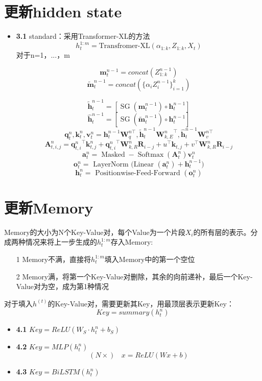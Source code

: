 \documentclass{article}
\begin{document}
\section{更新hidden state}
	\begin{itemize}
		\item \textbf{3.1} standard：采用Transformer-XL的方法
			$$h_t^{1:m} = \text{Transfromer-XL}(\alpha_{1:k}, Z_{1:k}, X_t)$$ 
			对于n=1，...，m
			
	$$\textbf{m}_t^{n-1} = concat(Z_{1:k}^{n-1})$$
	$$\tilde{\textbf{m}}_t^{n-1} = concat(\{\alpha_iZ_i^{n-1}\}_{i=1}^k) $$
			
$$\tilde{\mathbf{h}}_{t}^{n-1}=\left[\operatorname{SG}\left(\mathbf{m}_{t}^{n-1}\right) \circ \mathbf{h}_{t}^{n-1}\right]$$
$$\hat{\mathbf{h}}_{t}^{n-1}=\left[\operatorname{SG}\left(\tilde{\mathbf{m}}_{t}^{n-1}\right) \circ \mathbf{h}_{t}^{n-1}\right]$$
$$\mathbf{q}_{t}^{n}, \mathbf{k}_{t}^{n}, \mathbf{v}_{t}^{n}=\mathbf{h}_{t}^{n-1} \mathbf{W}_{q}^{n \top}, \tilde{\mathbf{h}}_{t}^{n-1} {\mathbf{W}_{k, E}^{n}}^{\top}, \hat{\mathbf{h}}_{t}^{n-1} \mathbf{W}_{v}^{n \top}$$
$$\mathbf{A}_{t, i, j}^{n}={\mathbf{q}_{t, i}^{n}}^{\top} \mathbf{k}_{t, j}^{n}+{\mathbf{q}_{t, i}^{n}}^{\top} \mathbf{W}_{k, R}^{n} \mathbf{R}_{i-j}+u^{\top} \mathbf{k}_{t, j}+v^{\top} \mathbf{W}_{k, R}^{n} \mathbf{R}_{i-j}$$
$$\mathbf{a}_{t}^{n}=\operatorname{Masked}-\operatorname{Softmax}\left(\mathbf{A}_{t}^{n}\right) \mathbf{v}_{t}^{n}$$
$$\mathbf{o}_{t}^{n}=\text { LayerNorm (Linear }\left(\mathbf{a}_{t}^{n}\right)+\mathbf{h}_{t}^{n-1} )$$
$$\mathbf{h}_{t}^{n}=\text { Positionwise-Feed-Forward }\left(\mathbf{o}_{t}^{n}\right)$$


	\end{itemize}
\section{更新Memory}
	Memory的大小为N个Key-Value对，每个Value为一个片段$X_i$的所有层的表示。分成两种情况来将上一步生成的$h_t^{1:m}$存入Memory:
	\begin{itemize}
		\item[1] Memory不满，直接将$h_t^{1:m}$填入Memory中的第一个空位
		\item[2] Memory满，将第一个Key-Value对删除，其余的向前递补，最后一个Key-Value对为空，成为第1种情况
	\end{itemize}
	对于填入$h^{(t)}$的Key-Value对，需要更新其Key，用最顶层表示更新Key：
	$$Key = summary(h_t^n)$$
	\begin{itemize}
		\item \textbf{4.1} $Key = ReLU(W_S\cdot h_t^n + b_S)$
		\item \textbf{4.2} $Key = MLP(h_t^n)$
			$$(N \times)\ \ \ \  x = ReLU(Wx + b)$$
		\item \textbf{4.3} $Key = BiLSTM(h_t^n)$
	\end{itemize}


\end{document}
